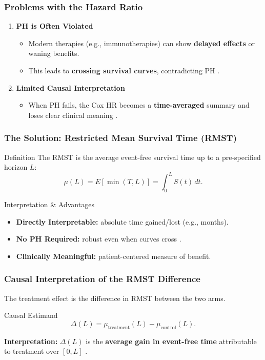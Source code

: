 \documentclass{beamer}
\begin{document}
\begin{frame}
\frametitle{Problems with the Hazard Ratio}
\begin{enumerate}
    \item \textbf{PH is Often Violated}
    \begin{itemize}
        \item Modern therapies (e.g., immunotherapies) can show \textbf{delayed effects} or waning benefits.
        \item This leads to \textbf{crossing survival curves}, contradicting PH \cite{uno2014}.
    \end{itemize}
    \vspace{1em}
    \item \textbf{Limited Causal Interpretation}
    \begin{itemize}
        \item When PH fails, the Cox HR becomes a \textbf{time-averaged} summary and loses clear clinical meaning \cite{royston2013, uno2014}.
    \end{itemize}
\end{enumerate}
\end{frame}

\begin{frame}
\frametitle{The Solution: Restricted Mean Survival Time (RMST)}
\begin{block}{Definition}
The RMST is the average event-free survival time up to a pre-specified horizon $L$:
\[
\mu(L) = E[\min(T, L)] = \int_0^L S(t)\, dt.
\]
\end{block}

\begin{block}{Interpretation \& Advantages}
\begin{itemize}
    \item \textbf{Directly Interpretable:} absolute time gained/lost (e.g., months).
    \item \textbf{No PH Required:} robust even when curves cross \cite{royston2013, uno2014}.
    \item \textbf{Clinically Meaningful:} patient-centered measure of benefit.
\end{itemize}
\end{block}
\end{frame}

\begin{frame}
\frametitle{Causal Interpretation of the RMST Difference}
The treatment effect is the difference in RMST between the two arms.

\begin{block}{Causal Estimand}
\[
\Delta(L) = \mu_{\text{treatment}}(L) - \mu_{\text{control}}(L).
\]
\end{block}

\textbf{Interpretation:} $\Delta(L)$ is the \textbf{average gain in event-free time} attributable to treatment over $[0,L]$ \cite{uno2014}.
\end{frame}
\end{document}
